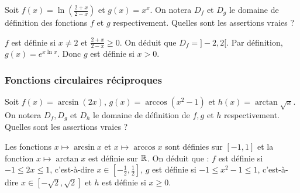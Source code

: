 \begin{question} 
Soit $ f(x)= \ln(\frac{2+x}{2-x}) $ et $g(x)=x^x$. On notera $D_f$ et $D_g$ le domaine de définition des fonctions $f$ et $g$ respectivement. Quelles sont les assertions vraies ?
\begin{answers}

    \good{$D_f=]-2,2[$}


    \good{$D_g=]0,+\infty[$}
\end{answers}
\begin{explanations}
$f$ est définie  si $x\neq 2$ et $\frac{2+x}{2-x}\ge 0$. On déduit que 
 $D_f=]-2,2[$. Par définition, $g(x)=e^{x\ln x}$. Donc $g$ est définie si $x>0$.
\end{explanations}

\end{question}


\subsubsection{Fonctions circulaires réciproques}


\begin{question} 
Soit $f(x)= \arcsin (2x), \, g(x)= \arccos (x^2-1) $ et $h(x)= \arctan \sqrt{x}$. On notera $D_f,D_g$ et $D_h$  le domaine de définition de $f, g$ et $h$ respectivement. Quelles sont les assertions vraies ?
\begin{answers}


    
    \good{$D_h=[0,+\infty[$}

    
\end{answers}
\begin{explanations}
Les fonctions $x\mapsto \arcsin x$ et  $x \mapsto \arccos x$ sont définies sur $[-1,1]$ et la fonction  $x \mapsto  \arctan x$ est définie sur $\mathbb{R}$. On déduit que :
$f$ est définie si $-1\le 2x\le 1$, c'est-à-dire $x \in [-\frac{1}{2}, \frac{1}{2}]$, 
$g$ est définie si $-1 \le x^2-1 \le 1$, c'est-à-dire $x\in [-\sqrt 2, \sqrt 2]$ et  $h$ est définie si $x\ge 0$.
\end{explanations}

\end{question}


